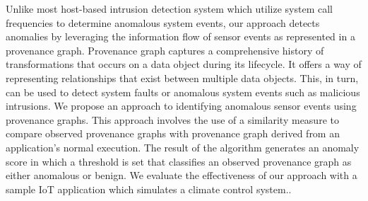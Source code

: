  \par Unlike most host-based intrusion detection system which utilize system call frequencies to determine anomalous system events, our approach detects anomalies by leveraging the information flow of sensor events as represented in a provenance graph. Provenance graph captures a comprehensive history of transformations that occurs on a data object during its lifecycle. It offers a way of representing relationships that exist between multiple data objects. This, in turn, can be used to detect system faults or anomalous system events such as malicious intrusions. We propose an approach to identifying anomalous sensor events using provenance graphs. This approach involves the use of a similarity measure to compare observed provenance graphs with provenance graph derived from an application's normal execution. The result of the algorithm generates an anomaly score in which a threshold is set that classifies an observed provenance graph as either anomalous or benign. We evaluate the effectiveness of our approach with a sample IoT application which simulates a climate control system..




%
%
%
%
%
%
%
%
%
%
%
%
%

